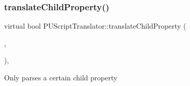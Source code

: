 \mbox{\label{classPUScriptTranslator_a034400413735bff32503c4bc24620286}} 
\subsubsection{\texorpdfstring{translate\+Child\+Property()}{translateChildProperty()}\hspace{0.1cm}{\footnotesize\ttfamily [1/2]}}
{\footnotesize\ttfamily virtual bool P\+U\+Script\+Translator\+::translate\+Child\+Property (\begin{DoxyParamCaption}\item[{\hyperlink{classPUScriptCompiler}{P\+U\+Script\+Compiler} $\ast$}]{,  }\item[{\hyperlink{classPUAbstractNode}{P\+U\+Abstract\+Node} $\ast$}]{ }\end{DoxyParamCaption})\hspace{0.3cm}{\ttfamily [inline]}, {\ttfamily [virtual]}}

Only parses a certain child property 

